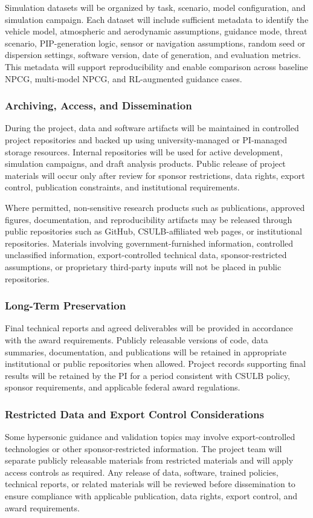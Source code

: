 Simulation datasets will be organized by task, scenario, model configuration, and simulation campaign. Each dataset will include sufficient metadata to identify the vehicle model, atmospheric and aerodynamic assumptions, guidance mode, threat scenario, PIP-generation logic, sensor or navigation assumptions, random seed or dispersion settings, software version, date of generation, and evaluation metrics. This metadata will support reproducibility and enable comparison across baseline NPCG, multi-model NPCG, and RL-augmented guidance cases.

\subsubsection{Archiving, Access, and Dissemination}

During the project, data and software artifacts will be maintained in controlled project repositories and backed up using university-managed or PI-managed storage resources. Internal repositories will be used for active development, simulation campaigns, and draft analysis products. Public release of project materials will occur only after review for sponsor restrictions, data rights, export control, publication constraints, and institutional requirements.

Where permitted, non-sensitive research products such as publications, approved figures, documentation, and reproducibility artifacts may be released through public repositories such as GitHub, CSULB-affiliated web pages, or institutional repositories. Materials involving government-furnished information, controlled unclassified information, export-controlled technical data, sponsor-restricted assumptions, or proprietary third-party inputs will not be placed in public repositories.

\subsubsection{Long-Term Preservation}

Final technical reports and agreed deliverables will be provided in accordance with the award requirements. Publicly releasable versions of code, data summaries, documentation, and publications will be retained in appropriate institutional or public repositories when allowed. Project records supporting final results will be retained by the PI for a period consistent with CSULB policy, sponsor requirements, and applicable federal award regulations.

\subsubsection{Restricted Data and Export Control Considerations}

Some hypersonic guidance and validation topics may involve export-controlled technologies or other sponsor-restricted information. The project team will separate publicly releasable materials from restricted materials and will apply access controls as required. Any release of data, software, trained policies, technical reports, or related materials will be reviewed before dissemination to ensure compliance with applicable publication, data rights, export control, and award requirements.
